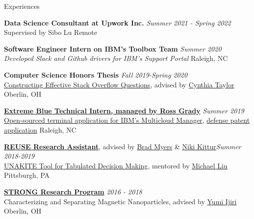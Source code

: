 \documentclass{resume}
\begin{document}
\begin{rSection}{Experiences}

\textbf{Data Science Consultant at Upwork Inc.} \hfill  {\em Summer 2021 - Spring 2022} \\
{Supervised by Sibo Lu} \hfill {Remote} 

\textbf{Software Engineer Intern on IBM's Toolbox Team} \hfill  {\em Summer 2020} \\
{\it Developed Slack and Github drivers for IBM's Support Portal} \hfill {Raleigh, NC} 


\textbf{Computer Science Honors Thesis} \hfill  {\em Fall 2019-Spring 2020} \\ {\href{https://digitalcommons.oberlin.edu/cgi/viewcontent.cgi?article=1693&context=honors}{Constructing Effective Stack Overflow Questions}, advised by \href{https://cs.oberlin.edu/~ctaylor/}{Cynthia Taylor}} \hfill {Oberlin, OH}


\href{https://www.ibm.com/employment/extremeblue/index.html}{\textbf{Extreme Blue Technical Intern, managed by Ross Grady}} \hfill  {\em Summer 2019} \\
\href{https://github.com/IBM/multicloud-incident-response-navigator}{Open-sourced terminal application for IBM's Multicloud Manager}, \href{https://priorart.ip.com/IPCOM/000262660}{defense patent application} \hfill { Raleigh, NC} 

 
\href{https://www.cmu.edu/scs/isr/reuse/}{\bf REUSE Research Assistant}, advised by \href{https://www.cs.cmu.edu/~bam/}{Brad Myers} \& \href{https://kittur.org/}{Niki Kittur}\hfill {\em Summer 2018-2019} \\
\href{https://unakite.info/}{UNAKITE Tool for Tabulated Decision Making}, mentored by \href{https://lxieyang.github.io/}{Michael Liu} \hfill { Pittsburgh, PA}

{\bf \href{https://www.oberlin.edu/undergraduate-research/programs/strong}{STRONG Research Program}} \hfill {\em 2016 - 2018}\\
Characterizing and Separating Magnetic Nanoparticles, advised by \href{https://www.oberlin.edu/yumi-ijiri}{Yumi Ijiri} \hfill { Oberlin, OH}
\end{rSection}
\end{document}
